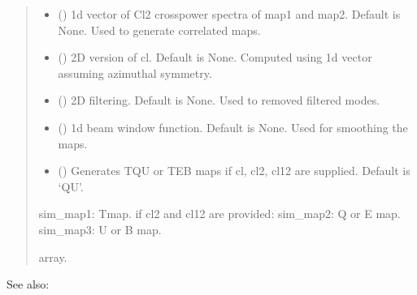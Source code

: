 \documentclass[letterpaper,10pt,english]{sphinxmanual}
\begin{document}
\begin{fulllineitems}
\begin{quote}
\begin{description}
\begin{itemize}
\item {} 
\sphinxAtStartPar
{} (\sphinxstyleliteralemphasis{\sphinxupquote{ (}}\sphinxstyleliteralemphasis{\sphinxupquote{)}}) \textendash{} 1d vector of Cl2 cross\sphinxhyphen{}power spectra of map1 and map2.
Default is None. Used to generate correlated maps.

\item {} 
\sphinxAtStartPar
{} () \textendash{} 2D version of cl.
Default is None. Computed using 1d vector assuming azimuthal symmetry.

\item {} 
\sphinxAtStartPar
{} () \textendash{} 2D filtering.
Default is None. Used to removed filtered modes.

\item {} 
\sphinxAtStartPar
{} () \textendash{} 1d beam window function.
Default is None. Used for smoothing the maps.

\item {} 
\sphinxAtStartPar
{} () \textendash{} Generates TQU or TEB maps if cl, cl2, cl12 are supplied.
Default is ‘QU’.

\end{itemize}

\sphinxAtStartPar
{} \textendash{} sim\_map1: T\sphinxhyphen{}map.
if cl2 and cl12 are provided:
sim\_map2: Q or E map.
sim\_map3: U or B map.

\sphinxAtStartPar
array.

\end{description}\end{quote}


\begin{sphinxseealso}{See also:}

\sphinxAtStartPar
{\hyperref[\detokenize{flatsky:flatsky.cl2map}]{}}


\end{sphinxseealso}


\end{fulllineitems}
\end{document}
